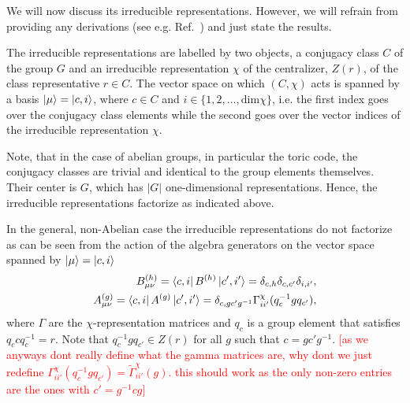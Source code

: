 \documentclass[two column]{article}
\newcommand{\caro}[1]{\textcolor{red}{[#1]}}
\begin{document}
%
 

We will now discuss its irreducible representations. However, we will refrain from providing any derivations (see e.g. Ref.~\cite{Cui_2015}) and just state the results. 

The irreducible representations are labelled by two objects, a conjugacy class $C$ of the group $G$ and an irreducible representation $\chi$ of the centralizer, $Z(r)$, of the class representative $r \in C$. The vector space on which $(C, \chi)$ acts is spanned by a basis $\ket{\mu} = \ket{c, i}$, where $c \in C$ and $i \in \{1, 2, \ldots, \text{dim}\chi\}$, i.e. the first index goes over the conjugacy class elements while the second goes over the vector indices of the irreducible representation $\chi$.

Note, that in the case of abelian groups, in particular the toric code, the conjugacy classes are trivial and identical to the group elements themselves. Their center is $G$, which has $|G|$ one-dimensional representations. Hence, the irreducible representations factorize as indicated above. 

In the general, non-Abelian case the irreducible representations do not factorize as can be seen from the action of the algebra generators on the vector space spanned by $\ket{\mu}=\ket{c,i}$ %
\begin{equation}
    \begin{split}
        B^{(h)}_{\mu\nu}=\bra{c, i} B^{(h)} \ket{c', i'} = \delta_{c, h} \delta_{c, c'}\delta_{i, i'}, \\
        A^{(g)}_{\mu\nu} = \bra{c, i} A^{(g)} \ket{c', i'} = \delta_{c,gc'g^{-1}} \Gamma^\chi_{ii'}(q_{c}^{-1}gq_{c'}),
    \end{split}
\end{equation}
where $\Gamma$ are the $\chi$-representation matrices and $q_c$ is a group element that satisfies $q_c c q_c^{-1} = r$. Note that $q_c^{-1}gq_{c'} \in Z(r)$ for all $g$ such that $c = gc'g^{-1}$. \caro{as we anyways dont really define what the gamma matrices are, why dont we just redefine $\Gamma^\chi_{ii'}(q_{c}^{-1}gq_{c'})=\tilde \Gamma^\chi_{ii'}(g)$. this should work as the only non-zero entries are the ones with $c'=g^{-1}cg$}
\end{document}
